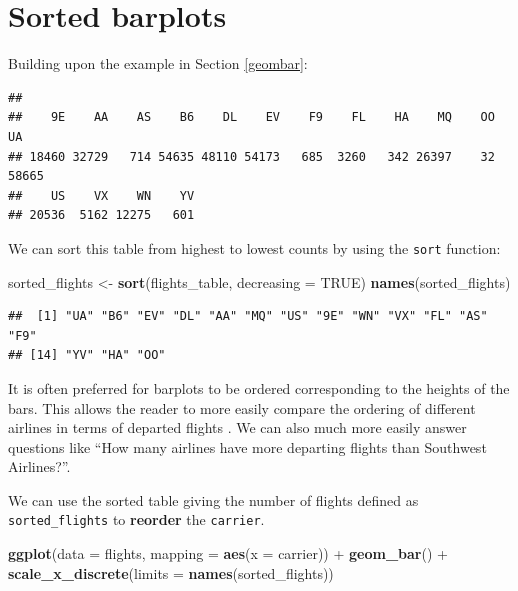\documentclass[]{tufte-book}
\newenvironment{Shaded}{\begin{snugshade}}{\end{snugshade}}
\newcommand{\KeywordTok}[1]{\textcolor[rgb]{0.13,0.29,0.53}{\textbf{{#1}}}}
\newcommand{\DataTypeTok}[1]{\textcolor[rgb]{0.13,0.29,0.53}{{#1}}}
\newcommand{\StringTok}[1]{\textcolor[rgb]{0.31,0.60,0.02}{{#1}}}
\newcommand{\OtherTok}[1]{\textcolor[rgb]{0.56,0.35,0.01}{{#1}}}
\newcommand{\NormalTok}[1]{{#1}}
\begin{document}
\section{Sorted barplots}\label{sorted-barplots}

Building upon the example in Section \ref{geombar}:

\begin{Shaded}
\end{Shaded}

\begin{verbatim}
## 
##    9E    AA    AS    B6    DL    EV    F9    FL    HA    MQ    OO    UA 
## 18460 32729   714 54635 48110 54173   685  3260   342 26397    32 58665 
##    US    VX    WN    YV 
## 20536  5162 12275   601
\end{verbatim}

We can sort this table from highest to lowest counts by using the
\texttt{sort} function:

\begin{Shaded}
\begin{Highlighting}[]
\NormalTok{sorted_flights <-}\StringTok{ }\KeywordTok{sort}\NormalTok{(flights_table, }\DataTypeTok{decreasing =} \OtherTok{TRUE}\NormalTok{)}
\KeywordTok{names}\NormalTok{(sorted_flights)}
\end{Highlighting}
\end{Shaded}

\begin{verbatim}
##  [1] "UA" "B6" "EV" "DL" "AA" "MQ" "US" "9E" "WN" "VX" "FL" "AS" "F9"
## [14] "YV" "HA" "OO"
\end{verbatim}

It is often preferred for barplots to be ordered corresponding to the
heights of the bars. This allows the reader to more easily compare the
ordering of different airlines in terms of departed flights
\citep{robbins2013}. We can also much more easily answer questions like
``How many airlines have more departing flights than Southwest
Airlines?''.

We can use the sorted table giving the number of flights defined as
\texttt{sorted\_flights} to \textbf{reorder} the \texttt{carrier}.

\begin{Shaded}
\begin{Highlighting}[]
\KeywordTok{ggplot}\NormalTok{(}\DataTypeTok{data =} \NormalTok{flights, }\DataTypeTok{mapping =} \KeywordTok{aes}\NormalTok{(}\DataTypeTok{x =} \NormalTok{carrier)) +}
\StringTok{  }\KeywordTok{geom_bar}\NormalTok{() +}
\StringTok{  }\KeywordTok{scale_x_discrete}\NormalTok{(}\DataTypeTok{limits =} \KeywordTok{names}\NormalTok{(sorted_flights))}
\end{Highlighting}
\end{Shaded}
\end{document}
